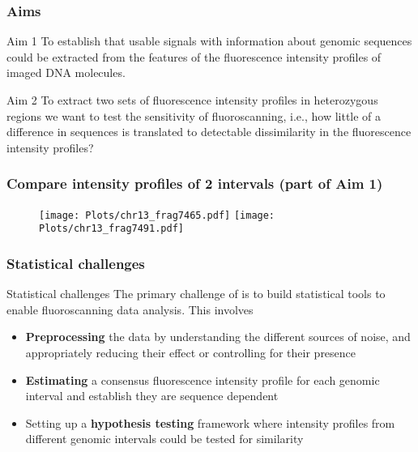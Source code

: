 \documentclass[10pt,dvipsnames,table]{beamer}
\begin{document}
\begin{frame}
\frametitle{Aims}
\begin{block}{Aim 1}
To establish that usable signals with information about genomic sequences could be extracted from the features of the fluorescence intensity profiles of imaged DNA molecules.
\end{block}
\vspace{1cm}
\begin{block}{Aim 2}
To extract two sets of fluorescence intensity profiles in heterozygous regions we want to test the sensitivity of fluoroscanning, i.e., how little of a difference in sequences is translated to detectable dissimilarity in the fluorescence intensity profiles?
\end{block}
\end{frame}

\begin{frame}
\frametitle{Compare intensity profiles of 2 intervals (part of Aim 1)}
\begin{figure}[t]
\texttt{[image: Plots/chr13\_frag7465.pdf]}
\texttt{[image: Plots/chr13\_frag7491.pdf]}
\end{figure}
\end{frame}

\begin{frame}
\frametitle{Statistical challenges}
\begin{block}{Statistical challenges}
The primary challenge of is to build statistical tools to enable fluoroscanning data analysis. This involves
\begin{itemize}
\item {\bf{Preprocessing}} the data by understanding the different sources of noise, and appropriately reducing their effect or controlling for their presence
\item {\bf{Estimating}} a consensus fluorescence intensity profile for each genomic interval and establish they are sequence dependent
\item Setting up a {\bf{hypothesis testing}} framework where intensity profiles from different genomic intervals could be tested for similarity
\end{itemize}
\end{block}
\end{frame}
\end{document}
